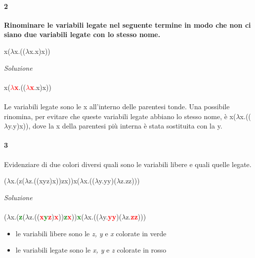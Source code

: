 \documentclass[10pt,a4paper, italian]{book}
\begin{document}
\paragraph{2}
\textbf{Rinominare le variabili legate nel seguente termine in modo che non ci siano due variabili legate con lo stesso nome.}
\begin{center}x($\lambda$x.(($\lambda$x.x)x))\end{center}
\textit{Soluzione}\\\\
x(\textbf{\textcolor{red}{$\lambda$x}}.((\textbf{\textcolor{red}{$\lambda$x}}.x)x))\\\\
Le variabili legate sono le x all'interno delle parentesi tonde. Una possibile rinomina, per evitare che queste variabili legate abbiano lo stesso nome, \`e x($\lambda$x.(($\lambda$y.y)x)), dove la x della parentesi pi\`u interna \`e stata sostituita con la y.

\paragraph{3}
Evidenziare di due colori diversi quali sono le variabili libere e quali quelle legate.
\begin{center}($\lambda$x.(z($\lambda$z.((xyz)x))zx))x($\lambda$x.(($\lambda$y.yy)($\lambda$z.zz)))\end{center}
\textit{Soluzione}\\\\
($\lambda$x.(\textbf{\textcolor{green}{z}}($\lambda$z.((\textbf{\textcolor{red}{x}\textcolor{green}{y}\textcolor{red}{z}})\textbf{\textcolor{red}{x}}))\textbf{\textcolor{green}{z}\textcolor{red}{x}}))\textbf{\textcolor{green}{x}}($\lambda$x.(($\lambda$y.\textbf{\textcolor{red}{yy}})($\lambda$z.\textbf{\textcolor{red}{zz}})))
\begin{itemize}
\item le variabili libere sono le \textit{z, y} e \textit{x} colorate in verde
\item le variabili legate sono le \textit{x, y} e \textit{z} colorate in rosso
\end{itemize}
\end{document}
